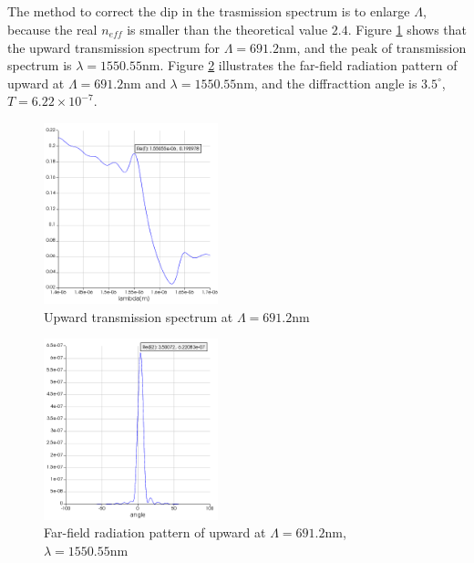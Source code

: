 \documentclass[fontsize=11pt]{scrartcl}
\begin{document}
\subsection{}
The method to correct the dip in the trasmission spectrum is 
to enlarge $\Lambda$, because the real $n_{eff}$ is smaller than the theoretical value $2.4$.
Figure \ref{fig3.6} shows that the upward transmission spectrum for $\Lambda=691.2\mathrm{nm}$, 
and the peak of transmission spectrum is $\lambda=1550.55\mathrm{nm}$. 
Figure \ref{fig3.7} illustrates the far-field radiation pattern of upward 
at $\Lambda=691.2\mathrm{nm}$ and $\lambda=1550.55\mathrm{nm}$, 
and the diffracttion angle is $3.5^\circ$, $T=6.22\times10^{-7}$.
\begin{figure}[H]
    \centering
     \includegraphics[width=0.45\textwidth]{img/fig3.6.png}
     \caption{Upward transmission spectrum at $\Lambda=691.2\mathrm{nm}$}
     \label{fig3.6}
\end{figure}
\begin{figure}[H]
    \centering
     \includegraphics[width=0.45\textwidth]{img/fig3.7.png}
     \caption{Far-field radiation pattern of upward at $\Lambda=691.2\mathrm{nm}$,
     $\lambda=1550.55\mathrm{nm}$}
     \label{fig3.7}
\end{figure}
\pagebreak
\end{document}
